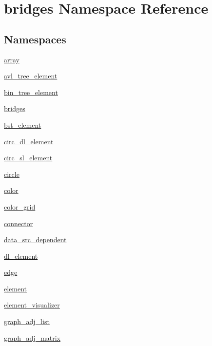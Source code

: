 \hypertarget{namespacebridges}{}\section{bridges Namespace Reference}
\label{namespacebridges}
\subsection*{Namespaces}
\begin{DoxyCompactItemize}
\item 
 \mbox{\hyperlink{namespacebridges_1_1array}{array}}
\item 
 \mbox{\hyperlink{namespacebridges_1_1avl__tree__element}{avl\+\_\+tree\+\_\+element}}
\item 
 \mbox{\hyperlink{namespacebridges_1_1bin__tree__element}{bin\+\_\+tree\+\_\+element}}
\item 
 \mbox{\hyperlink{namespacebridges_1_1bridges}{bridges}}
\item 
 \mbox{\hyperlink{namespacebridges_1_1bst__element}{bst\+\_\+element}}
\item 
 \mbox{\hyperlink{namespacebridges_1_1circ__dl__element}{circ\+\_\+dl\+\_\+element}}
\item 
 \mbox{\hyperlink{namespacebridges_1_1circ__sl__element}{circ\+\_\+sl\+\_\+element}}
\item 
 \mbox{\hyperlink{namespacebridges_1_1circle}{circle}}
\item 
 \mbox{\hyperlink{namespacebridges_1_1color}{color}}
\item 
 \mbox{\hyperlink{namespacebridges_1_1color__grid}{color\+\_\+grid}}
\item 
 \mbox{\hyperlink{namespacebridges_1_1connector}{connector}}
\item 
 \mbox{\hyperlink{namespacebridges_1_1data__src__dependent}{data\+\_\+src\+\_\+dependent}}
\item 
 \mbox{\hyperlink{namespacebridges_1_1dl__element}{dl\+\_\+element}}
\item 
 \mbox{\hyperlink{namespacebridges_1_1edge}{edge}}
\item 
 \mbox{\hyperlink{namespacebridges_1_1element}{element}}
\item 
 \mbox{\hyperlink{namespacebridges_1_1element__visualizer}{element\+\_\+visualizer}}
\item 
 \mbox{\hyperlink{namespacebridges_1_1graph__adj__list}{graph\+\_\+adj\+\_\+list}}
\item 
 \mbox{\hyperlink{namespacebridges_1_1graph__adj__matrix}{graph\+\_\+adj\+\_\+matrix}}

\end{DoxyCompactItemize}

